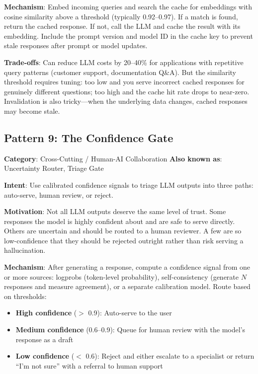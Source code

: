 \textbf{Mechanism}: Embed incoming queries and search the cache for embeddings with cosine similarity above a threshold (typically 0.92--0.97). If a match is found, return the cached response. If not, call the LLM and cache the result with its embedding. Include the prompt version and model ID in the cache key to prevent stale responses after prompt or model updates.

\textbf{Trade-offs}: Can reduce LLM costs by 20--40\% for applications with repetitive query patterns (customer support, documentation Q\&A). But the similarity threshold requires tuning: too low and you serve incorrect cached responses for genuinely different questions; too high and the cache hit rate drops to near-zero. Invalidation is also tricky---when the underlying data changes, cached responses may become stale.


\subsection{Pattern 9: The Confidence Gate}

\textbf{Category}: Cross-Cutting / Human-AI Collaboration \hfill \textbf{Also known as}: Uncertainty Router, Triage Gate

\textbf{Intent}: Use calibrated confidence signals to triage LLM outputs into three paths: auto-serve, human review, or reject.

\textbf{Motivation}: Not all LLM outputs deserve the same level of trust. Some responses the model is highly confident about and are safe to serve directly. Others are uncertain and should be routed to a human reviewer. A few are so low-confidence that they should be rejected outright rather than risk serving a hallucination.

\textbf{Mechanism}: After generating a response, compute a confidence signal from one or more sources: logprobs (token-level probability), self-consistency (generate $N$ responses and measure agreement), or a separate calibration model. Route based on thresholds:

\begin{itemize}[leftmargin=*]
    \item \textbf{High confidence} ($>$ 0.9): Auto-serve to the user
    \item \textbf{Medium confidence} (0.6--0.9): Queue for human review with the model's response as a draft
    \item \textbf{Low confidence} ($<$ 0.6): Reject and either escalate to a specialist or return ``I'm not sure'' with a referral to human support
\end{itemize}

